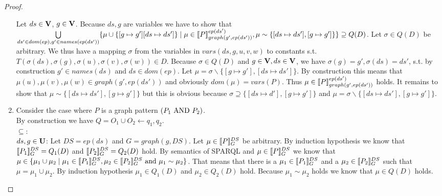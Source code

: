 \begin{proof}
\begin{enumerate}
			\bigskip\noindent
			Let $ds \in \mathbf{V}$, $g \in \mathbf{V}$.
			Because $ds,g$ are variables we have to show that 
			$\bigcup\limits_{ds' \in dom(ep),g' \in names(ep(ds'))} 
			\{ \mu \cup \{[g\mapsto g'][ds \mapsto ds'] \} \\ 
				\mid \mu \in \llbracket P
			\rrbracket^{ep(ds')}_{graph(g',ep(ds'))},
			\mu \sim \{[ds \mapsto ds'], [g \mapsto g']\}\} \supseteq Q(D)$.
			Let $\sigma \in Q(D)$ be arbitrary.
			We thus have a mapping $\sigma$ from the variables in $vars(ds,g,u,v,w)$ to constants s.t.
			$T(\sigma(ds),\sigma(g),\sigma(u),\sigma(v),\sigma(w)) \in D$.
			Because $\sigma \in Q(D)$ and $g \in \mathbf{V}, ds \in \mathbf{V}$, we have
			$\sigma(g) = g', \sigma(ds) = ds'$, s.t. by construction $g' \in
			names(ds)$ and $ds \in dom(ep)$. Let $\mu =
			\sigma\backslash\{[g\mapsto g'],
			[ds\mapsto ds']\}$. By construction
			this means that 	$\mu(u),\mu(v),\mu(w) \in graph(g',ep(ds'))$ 
			and obviously $dom(\mu) = vars(P)$. Thus $\mu \in \llbracket P
			\rrbracket^{ep(ds')}_{graph(g',ep(ds'))}$ holds. It remains to show that $\mu \sim \{[ds \mapsto
			ds'],[g \mapsto g']\}$
			but this is obvious because $\sigma \supseteq \{[ds \mapsto d'],[g \mapsto
			g']\}$  and $\mu = \sigma \backslash \{[ds \mapsto ds'],[g \mapsto
			g']\}$.


		\item Consider the case where $P$ is a graph pattern $(P_1 \mbox{ AND } P_2)$. \\
			By construction we have $Q = O_1 \cup O_2 \leftarrow q_1, q_2$. \\
			$\subseteq:$\\
			$ds,g \in \mathbf{U}$: Let $DS = ep(ds)$ and $G = graph(g,DS)$.
			Let $\mu \in \llbracket P \rrbracket^{DS}_{G}$ be arbitrary. 
			By induction hypothesis we know that
			$\llbracket P_1 \rrbracket^{DS}_{G} = Q_1(D)$  and
			$\llbracket P_2 \rrbracket^{DS}_{G} = Q_2(D)$ hold.
			By semantics of SPARQL and $\mu \in \llbracket P \rrbracket^{DS}_{G}$ we know that 
			$\mu \in \{\mu_1 \cup \mu_2 \mid \mu_1 \in \llbracket P_1 \rrbracket^{DS}_{G}, \mu_2 \in \llbracket
			P_2 \rrbracket^{DS}_{G} \mbox{ and }  \mu_1 \sim \mu_2\}$. 
			That means that there is a $\mu_1 \in \llbracket P_1 \rrbracket_{G}^{DS}$ 
			and a $\mu_2 \in \llbracket P_2 \rrbracket^{DS}_{G}$ such that $\mu = \mu_1 \cup \mu_2$.
			By induction hypothesis $\mu_1 \in Q_1(D)$ and $\mu_2 \in Q_2(D)$ hold.
			Because $\mu_1 \sim \mu_2$ holds we know that $\mu \in Q(D)$ holds. 


\end{enumerate}
\end{proof}
